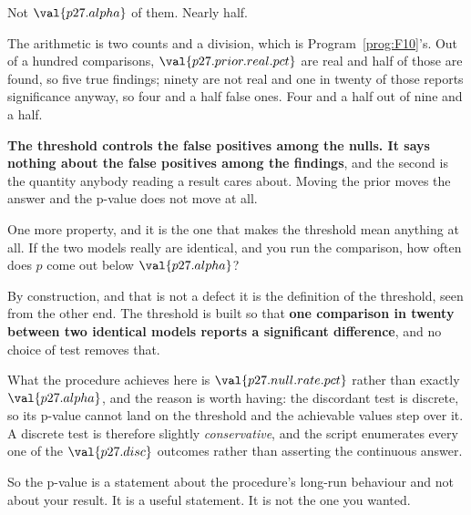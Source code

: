\begin{fr}

Not $\val{p27.alpha}$ of them. Nearly half.

The arithmetic is two counts and a division, which is
Program~\ref{prog:F10}'s. Out of a hundred comparisons,
$\val{p27.prior.real.pct}$ are real and half of those are found, so five true
findings; ninety are not real and one in twenty of those reports
significance anyway, so four and a half false ones. Four and a half out of
nine and a half.

\textbf{The threshold controls the false positives among the nulls. It says
nothing about the false positives among the findings}, and the second is the
quantity anybody reading a result cares about. Moving the prior moves the
answer and the p-value does not move at all.
\end{fr}

\begin{fr}
One more property, and it is the one that makes the threshold mean anything
at all. If the two models really are identical, and you run the comparison,
how often does $p$ come out below $\val{p27.alpha}$?
\dotline
\nextframe
\end{fr}

\begin{fr}

By construction, and that is not a defect \dash{} it is the definition of the
threshold, seen from the other end. The threshold is built so that
\textbf{one comparison in twenty between two identical models reports a
significant difference}, and no choice of test removes that.

What the procedure achieves here is $\val{p27.null.rate.pct}$ rather than
exactly $\val{p27.alpha}$, and the reason is worth having: the discordant
test is
discrete, so its p-value cannot land on the threshold and the achievable
values step over it. A discrete test is therefore slightly
\emph{conservative}, and the script enumerates every one of the
$\val{p27.disc}$ outcomes rather than asserting the continuous answer.

So the p-value is a statement about the procedure's long-run behaviour and
not about your result. It is a useful statement. It is not the one you wanted.
\end{fr}

